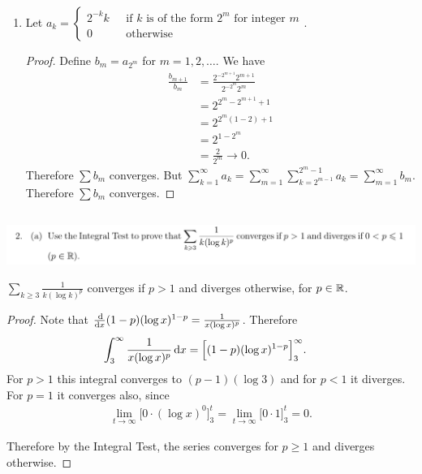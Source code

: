 \documentclass[12pt]{article}
\begin{document}
\begin{enumerate}[label=(\alph*)]
\item
  \begin{claim*}
    Let $a_k =
    \begin{cases}
      2^{-k}k ~~~ &\text{if $k$ is of the form $2^m$ for integer $m$}\\
      0      ~~~ &\text{otherwise}
    \end{cases}$.
  \end{claim*}

  \begin{proof}
    Define $b_m = a_{2^m}$ for $m = 1, 2, \ldots$. We have
    \begin{align*}
      \frac{b_{m+1}}{b_m}
      &= \frac{2^{-2^{m+1}}2^{m+1}}
              {2^{-2^m}2^m}\\
      &= 2^{2^m-2^{m+1} + 1}\\
      &= 2^{2^m(1 - 2) + 1}\\
      &= 2^{1 - 2^m}\\
      &= \frac{2}{2^m} \to 0.
    \end{align*}
    Therefore $\sum b_m$ converges. But
    $\sum_{k=1}^\infty a_k = \sum_{m=1}^\infty \sum_{k=2^{m-1}}^{2^m - 1} a_k = \sum_{m=1}^\infty
    b_m$. Therefore $\sum b_m$ converges.
  \end{proof}
\end{enumerate}


\newpage
\subsection{}
\begin{mdframed}
\includegraphics[width=400pt]{img/analysis--oxford-M2-I-6-2.png}
\end{mdframed}

\begin{claim*}
  $\sum_{k\geq3} \frac{1}{k(\log k)^p}$ converges if $p > 1$ and diverges otherwise, for
  $p \in \mathbb{R}$.
\end{claim*}

\begin{proof}
  Note that $\ddx (1 - p)(\log x)^{1 - p} = \frac{1}{x(\log x)^p}$. Therefore
  \begin{align*}
    \int_3^\infty \frac{1}{x(\log x)^p} \dx
    & = \Big[(1 - p)(\log x)^{1 - p}\Big]_3^\infty.
  \end{align*}
  For $p > 1$ this integral converges to $(p - 1)(\log 3)$ and for $p < 1$ it diverges. For $p = 1$
  it converges also, since
  \begin{align*}
    \lim_{t \to \infty} \Big[0\cdot(\log x)^0\Big]_3^t = \lim_{t \to \infty} \Big[0\cdot 1\Big]_3^t = 0.
  \end{align*}

  Therefore by the Integral Test, the series converges for $p \geq 1$ and diverges otherwise.
\end{proof}
\end{document}
